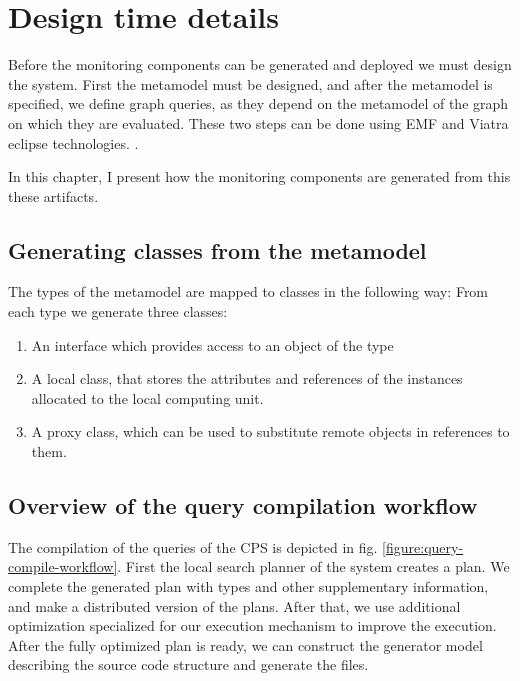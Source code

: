 \chapter{Design time details}

Before the monitoring components can be generated and deployed we must design the system. First the metamodel must be designed, and after the metamodel is specified, we define graph queries, as they depend on the metamodel of the graph on which they are evaluated. These two steps can be done using EMF and Viatra eclipse technologies. . 
 
In this chapter, I present how the monitoring components are generated from this these artifacts. 


\section{Generating classes from the metamodel}

The types of the metamodel are mapped to \cpp{} classes in the following way: From each type we generate three \cpp{} classes:

\begin{enumerate}
	\item An interface which provides access to an object of the type
	\item A local class, that stores the attributes and references of the instances allocated to the local computing unit.
	\item A proxy class, which can be used to substitute remote objects in references to them.
\end{enumerate}


\section{Overview of the query compilation workflow}

The compilation of the queries of the CPS is depicted in fig. \ref{figure:query-compile-workflow}. First the local search planner of the \viatra{} system creates a plan. We complete the generated plan with types and other supplementary information, and make a distributed version of the plans. After that, we use additional optimization specialized for our execution mechanism to improve the execution. After the fully optimized plan is ready, we can construct the generator model describing the source code structure and generate the \cpp{} files.

